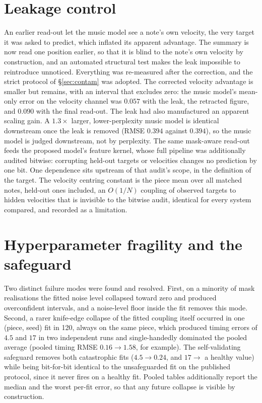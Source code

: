 \section{Leakage control}\label{sec:leak}
An earlier read-out let the music model see a note's own velocity, the very
target it was asked to predict, which inflated its apparent advantage. The
summary is now read one position earlier, so that it is blind to the note's
own velocity by construction, and an automated structural test makes the leak
impossible to reintroduce unnoticed. Everything was re-measured after the
correction, and the strict protocol of \S\ref{sec:contam} was adopted. The
corrected velocity advantage is smaller but remains, with an interval that
excludes zero: the music model's mean-only error on the velocity channel was
$0.057$ with the leak, the retracted figure, and $0.090$ with the final
read-out. The leak had also manufactured an apparent scaling gain. A
$1.3\times$ larger, lower-perplexity music model is identical downstream once
the leak is removed (RMSE $0.394$ against $0.394$), so the music model is
judged downstream, not by perplexity. The same mask-aware read-out feeds the
proposed model's feature kernel, whose full pipeline was additionally audited
bitwise: corrupting held-out targets or velocities changes no prediction by
one bit. One dependence sits upstream of that audit's scope, in the
definition of the target. The velocity centring constant is the piece mean
over all matched notes, held-out ones included, an $O(1/N)$ coupling of
observed targets to hidden velocities that is invisible to the bitwise audit,
identical for every system compared, and recorded as a limitation.

\section{Hyperparameter fragility and the safeguard}
Two distinct failure modes were found and resolved. First, on a minority of
mask realisations the fitted noise level collapsed toward zero and produced
overconfident intervals, and a noise-level floor inside the fit removes this
mode. Second, a rarer knife-edge collapse of the fitted coupling itself
occurred in one (piece, seed) fit in 120, always on the same piece, which
produced timing errors of $4.5$ and $17$ in two independent runs and
single-handedly dominated the pooled average (pooled timing RMSE
$0.16 \to 1.58$, for example). The self-validating safeguard removes both
catastrophic fits ($4.5 \to 0.24$, and $17 \to$ a healthy value) while being
bit-for-bit identical to the unsafeguarded fit on the published protocol,
since it never fires on a healthy fit. Pooled tables additionally report the
median and the worst per-fit error, so that any future collapse is visible by
construction.

